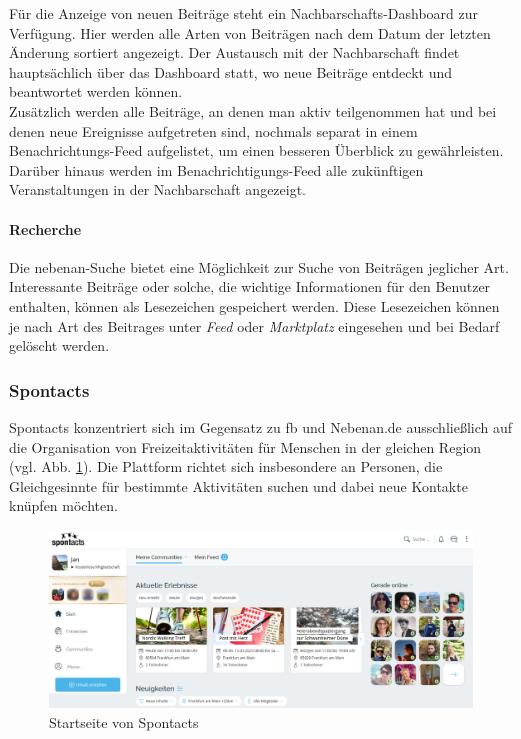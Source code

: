 Für die Anzeige von neuen Beiträge steht ein Nachbarschafts-Dashboard zur Verfügung. Hier werden alle Arten von Beiträgen nach dem Datum der letzten Änderung sortiert angezeigt. Der Austausch mit der Nachbarschaft findet hauptsächlich über das Dashboard statt, wo neue Beiträge entdeckt und beantwortet werden können. \\
Zusätzlich werden alle Beiträge, an denen man aktiv teilgenommen hat und bei denen neue Ereignisse aufgetreten sind, nochmals separat in einem Benachrichtungs-Feed aufgelistet, um einen besseren Überblick zu gewährleisten. Darüber hinaus werden im Benachrichtigungs-Feed alle zukünftigen Veranstaltungen in der Nachbarschaft angezeigt.

\paragraph{Recherche}

Die nebenan-Suche bietet eine Möglichkeit zur Suche von Beiträgen jeglicher Art. Interessante Beiträge oder solche, die wichtige Informationen für den Benutzer enthalten, können als Lesezeichen gespeichert werden. Diese Lesezeichen können je nach Art des Beitrages unter \textit{Feed} oder \textit{Marktplatz} eingesehen und bei Bedarf gelöscht werden.

\subsubsection{Spontacts}

Spontacts konzentriert sich im Gegensatz zu \acrshort{fb} und Nebenan.de ausschließlich auf die Organisation von Freizeitaktivitäten für Menschen in der gleichen Region (vgl. Abb. \ref{fig:spontacts}). Die Plattform richtet sich insbesondere an Personen, die Gleichgesinnte für bestimmte Aktivitäten suchen und dabei neue Kontakte knüpfen möchten.

\begin{figure}[!htb]
    \centering
    \includegraphics[width=\textwidth]{figures/jan/pic_spontacts.png}
    \caption[Startseite von Spontacts]{Startseite von Spontacts}
    \label{fig:spontacts}
\end{figure}

